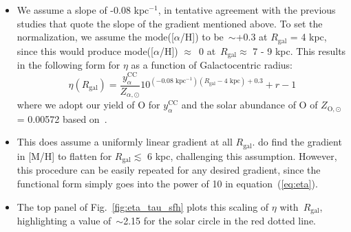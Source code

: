 \documentclass[fleqn, usenatbib]{mnras}
\newcommand{\refp}[1]{(\ref{#1})}
\begin{document}
\begin{itemize}
	\item We assume a slope of -0.08 kpc$^{-1}$, in tentative agreement with 
	the previous studies that quote the slope of the gradient mentioned above. 
	To set the normalization, we assume the mode([$\alpha$/H]) to be~$\sim$+0.3 
	at $R_\text{gal}$ = 4 kpc, since this would produce mode([$\alpha$/H]) 
	$\approx$~0 at~$R_\text{gal}\approx$ 7 - 9 kpc. This results in the 
	following form for $\eta$ as a function of Galactocentric radius: 
	\begin{equation} 
	\eta(R_\text{gal}) = \frac{y_\alpha^\text{CC}}{Z_{\alpha,\odot}} 
	10^{(-0.08\text{ kpc}^{-1})(R_\text{gal} - \text{4 kpc}) + 0.3} + r - 1 
	\label{eq:eta} 
	\end{equation} 
	where we adopt our yield of O for $y_\alpha^\text{CC}$ and the solar 
	abundance of O of $Z_{\text{O},\odot}$ = 0.00572 based 
	on~\citet{Asplund2009}. 

	\item This does assume a uniformly linear gradient at all $R_\text{gal}$. 
	\citet{Hayden2014} do find the gradient in [M/H] to flatten for 
	$R_\text{gal}\lesssim$ 6 kpc, challenging this assumption. However, this 
	procedure can be easily repeated for any desired gradient, since the 
	functional form simply goes into the power of 10 in equation~\refp{eq:eta}. 

	\item The top panel of Fig.~\ref{fig:eta_tau_sfh} plots this scaling of 
	$\eta$ with~$R_\text{gal}$, highlighting a value of~$\sim$2.15 for the 
	solar circle in the red dotted line. 
\end{itemize} 
\end{document}
